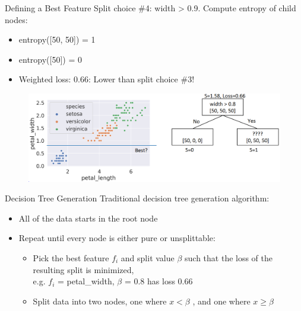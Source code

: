 \documentclass[aspectratio=169]{../latex_main/tntbeamer}  %
\begin{document}
	
	\begin{frame}{Defining a Best Feature}
 	    Split choice \#4: width > 0.9. Compute entropy of child nodes:
	    \begin{itemize}
	        \item entropy([50, 50]) = 1
	        \item entropy([50]) = 0
	        \item Weighted loss: 0.66: \alert{Lower than split choice \#3!}

	    \end{itemize}
	    
	    \begin{figure}
	        \centering
	        \includegraphics[scale=.4]{Bild51}
	    \end{figure}
	\end{frame}
	
	
	\begin{frame}[c]{Decision Tree Generation}
	    Traditional decision tree generation algorithm: 
	    \begin{itemize}
	        \item All of the data starts in the root node
	        \item Repeat until every node is either pure or unsplittable:
	        \begin{itemize}
	            \item Pick the best feature $f_i$ and split value $\beta$ such that the loss of the resulting split is minimized,\\ e.g. $f_i$ = petal\_width, $\beta$ = 0.8 has loss 0.66
	            \item Split data into two nodes, one where $x < \beta$ , and one where $x \geq \beta$ 
	        \end{itemize}
	    \end{itemize}

	\end{frame}
\end{document}
